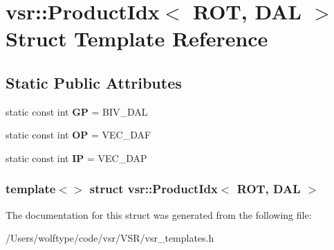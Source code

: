 \hypertarget{structvsr_1_1_product_idx_3_01_r_o_t_00_01_d_a_l_01_4}{\section{vsr\-:\-:Product\-Idx$<$ R\-O\-T, D\-A\-L $>$ Struct Template Reference}
\label{structvsr_1_1_product_idx_3_01_r_o_t_00_01_d_a_l_01_4}
}
\subsection*{Static Public Attributes}
\begin{DoxyCompactItemize}
\item 
\hypertarget{structvsr_1_1_product_idx_3_01_r_o_t_00_01_d_a_l_01_4_ac29e0bdf2f5fd6fbd0965987a664dc7b}{static const int {\bfseries G\-P} = B\-I\-V\-\_\-\-D\-A\-L}\label{structvsr_1_1_product_idx_3_01_r_o_t_00_01_d_a_l_01_4_ac29e0bdf2f5fd6fbd0965987a664dc7b}

\item 
\hypertarget{structvsr_1_1_product_idx_3_01_r_o_t_00_01_d_a_l_01_4_aae78eb3f6a9426fc2623a97436c87aa7}{static const int {\bfseries O\-P} = V\-E\-C\-\_\-\-D\-A\-F}\label{structvsr_1_1_product_idx_3_01_r_o_t_00_01_d_a_l_01_4_aae78eb3f6a9426fc2623a97436c87aa7}

\item 
\hypertarget{structvsr_1_1_product_idx_3_01_r_o_t_00_01_d_a_l_01_4_ae9dbb2aa32a28025a6252e87bfaa29f7}{static const int {\bfseries I\-P} = V\-E\-C\-\_\-\-D\-A\-P}\label{structvsr_1_1_product_idx_3_01_r_o_t_00_01_d_a_l_01_4_ae9dbb2aa32a28025a6252e87bfaa29f7}

\end{DoxyCompactItemize}
\subsubsection*{template$<$$>$ struct vsr\-::\-Product\-Idx$<$ R\-O\-T, D\-A\-L $>$}



The documentation for this struct was generated from the following file\-:\begin{DoxyCompactItemize}
\item 
/\-Users/wolftype/code/vsr/\-V\-S\-R/vsr\-\_\-templates.\-h\end{DoxyCompactItemize}
